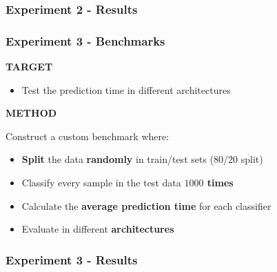\begin{frame}
\frametitle{Experiment 2 - Results}
\end{frame}

\begin{frame}
\frametitle{Experiment 3 - Benchmarks}
\textbf{TARGET}
\begin{itemize}
\item Test the prediction time in different architectures
\end{itemize}

\textbf{METHOD}

Construct a custom benchmark where:
\begin{itemize}
\item \textbf{Split} the data \textbf{randomly} in train/test sets ($80$/$20$ split)
\item Classify every sample in the test data \textbf{$1000$ times}
\item Calculate the \textbf{average prediction time} for each classifier
\item Evaluate in different \textbf{architectures}
\end{itemize}

\end{frame}


\begin{frame}
\frametitle{Experiment 3 - Results}
\end{frame}
